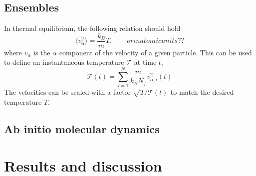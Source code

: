 \documentclass[11pt,bibliography=totoc,index=totoc]{scrbook}   %
\begin{document}
%
\section{Ensembles}
%

In thermal equilibrium, the following relation should hold
\begin{equation}
  \langle v_{\alpha}^2 \rangle = \frac{k_B}{m} T, \qquad{or in atomic units??}
\end{equation}
where $v_{\alpha}$ is the $\alpha$ component of the velocity of a given particle.
This can be used to define an instantaneous temperature $\mathcal{T}$ at time $t$,
\begin{equation}
  \mathcal{T}(t) = \sum_{i=1}^N \frac{m}{k_B N_f} v_{\alpha,i}^2(t)
\end{equation}
The velocities can be scaled with a factor $\sqrt{T/\mathcal{T}(t)}$ to match the desired temperature $T$.



%
\section{Ab initio molecular dynamics}
%





%
\chapter{Results and discussion}\label{cha:results} %
%
\end{document}
